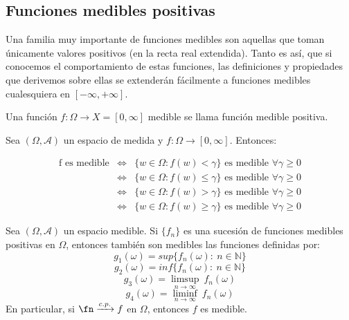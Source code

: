 
\subsection{Funciones medibles positivas}

Una familia muy importante de funciones medibles son aquellas que toman únicamente valores positivos (en la recta real extendida). Tanto es así, que si conocemos el comportamiento de estas funciones, las definiciones y propiedades que derivemos sobre ellas se extenderán fácilmente a funciones medibles cualesquiera en $[-\infty,+\infty]$.

\begin{ndef}
  Una función $f: \Omega \to X = [0,\infty ]$ medible se llama función medible positiva.
\end{ndef}


\begin{nprop} \label{criterio_medibles} Sea $(\Omega,\mathscr A)$ un espacio de medida y $f:\Omega \to [0,\infty]$. Entonces:

  \[
  \begin{array}{lll}
    \text{f es medible} & \iff & \{w \in \Omega : f(w) < \gamma \} \text{ es medible } \forall \gamma \geq 0\\

    & \iff & \{w \in \Omega : f(w) \leq \gamma \} \text{ es medible } \forall \gamma \geq 0\\

    & \iff & \{w \in \Omega : f(w) > \gamma \} \text{ es medible } \forall \gamma \geq 0\\

    & \iff & \{w \in \Omega : f(w) \geq \gamma \} \text{ es medible } \forall \gamma \geq 0
    \end{array}
  \]
\end{nprop}

\begin{nprop} \label {p1}
  Sea $(\Omega,\mathscr A)$ un espacio medible. Si $\{f_n\}$ es una sucesión de funciones medibles positivas en $\Omega$, entonces también son medibles las funciones definidas por:
  \[
    g_1(\omega) =  sup\{f_n(\omega) : \ n \in \mathbb{N} \}
  \]
  \[
    g_2(\omega) =  inf\{f_n(\omega) : \ n \in \mathbb{N} \}
  \]
  \[
    g_3(\omega) = \limsup_{n\to \infty} \ f_n(\omega)
  \]
  \[
    g_4(\omega) = \liminf_{n\to \infty}  \ f_n(\omega)
  \]
  En particular, si $\fn \xrightarrow{c.p.} f$ en $\Omega$, entonces $f$ es medible.
\end{nprop}

